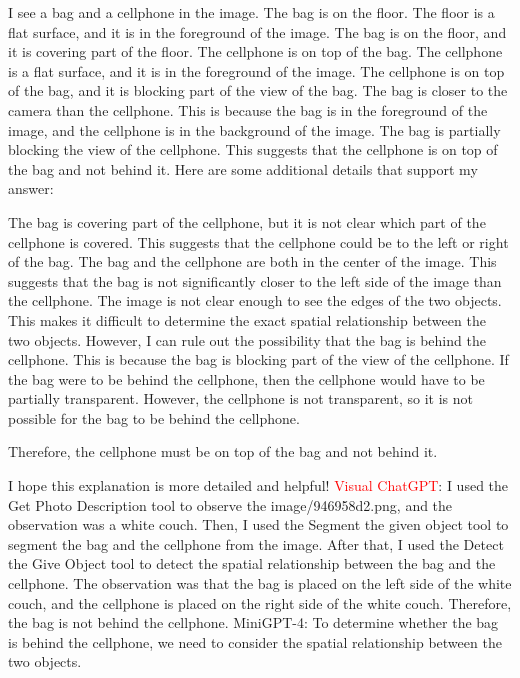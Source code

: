 \begin{enumerate}
    I see a bag and a cellphone in the image.
    The bag is on the floor. The floor is a flat surface, and it is in the foreground of the image. The bag is on the floor, and it is covering part of the floor.
    The cellphone is on top of the bag. The cellphone is a flat surface, and it is in the foreground of the image. The cellphone is on top of the bag, and it is blocking part of the view of the bag.
    The bag is closer to the camera than the cellphone. This is because the bag is in the foreground of the image, and the cellphone is in the background of the image.
    The bag is partially blocking the view of the cellphone. This suggests that the cellphone is on top of the bag and not behind it.
    Here are some additional details that support my answer:
    
    The bag is covering part of the cellphone, but it is not clear which part of the cellphone is covered. This suggests that the cellphone could be to the left or right of the bag.
    The bag and the cellphone are both in the center of the image. This suggests that the bag is not significantly closer to the left side of the image than the cellphone.
    The image is not clear enough to see the edges of the two objects. This makes it difficult to determine the exact spatial relationship between the two objects.
    However, I can rule out the possibility that the bag is behind the cellphone. This is because the bag is blocking part of the view of the cellphone. If the bag were to be behind the cellphone, then the cellphone would have to be partially transparent. However, the cellphone is not transparent, so it is not possible for the bag to be behind the cellphone.
    
    Therefore, the cellphone must be on top of the bag and not behind it.
    
    I hope this explanation is more detailed and helpful!
    \subitem \textcolor{red}{Visual ChatGPT}: I used the Get Photo Description tool to observe the image/946958d2.png, and the observation was a white couch. Then, I used the Segment the given object tool to segment the bag and the cellphone from the image. After that, I used the Detect the Give Object tool to detect the spatial relationship between the bag and the cellphone. The observation was that the bag is placed on the left side of the white couch, and the cellphone is placed on the right side of the white couch. Therefore, the bag is not behind the cellphone.
    \subitem MiniGPT-4: To determine whether the bag is behind the cellphone, we need to consider the spatial relationship between the two objects.


\end{enumerate}
